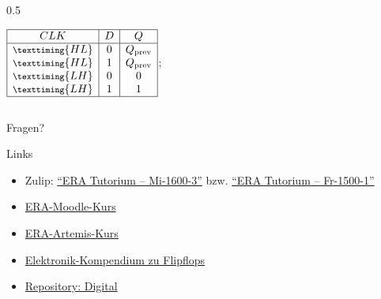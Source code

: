\begin{frame}[c]
\begin{columns}[c]
\begin{column}{0.5\textwidth}
\begin{center}
\begin{circuitikz}
{						$\displaystyle
							\begin{array}{|c|c|c|}
								\hline
								CLK                            & D & Q                 \\
								\hline
								\footnotesize{\texttiming{HL}} & 0 & Q_{\textrm{prev}} \\
								\footnotesize{\texttiming{HL}} & 1 & Q_{\textrm{prev}} \\
								\footnotesize{\texttiming{LH}} & 0 & 0                 \\
								\footnotesize{\texttiming{LH}} & 1 & 1                 \\
								\hline
							\end{array}
						$};
				\end{circuitikz}
			\end{center}
		\end{column}
	\end{columns}
\end{frame}


\begin{frame}[c, fragile]{}{}
	\begin{center}
		\LARGE Fragen?
	\end{center}
\end{frame}


\begin{frame}[c, fragile]{Links}{}
	\begin{itemize}
		\item Zulip: \href{https://zulip.in.tum.de/#narrow/channel/3255-ERA-Tutorium-.E2.80.93-Mi-1600-3}{\enquote{ERA Tutorium -- Mi-1600-3}}
		      bzw. \href{https://zulip.in.tum.de/#narrow/channel/3264-ERA-Tutorium-.E2.80.93-Fr-1500-1}{\enquote{ERA Tutorium -- Fr-1500-1}}
		\item \href{https://www.moodle.tum.de/course/view.php?id=111440}{ERA-Moodle-Kurs}
		\item \href{https://artemis.tum.de/courses/516}{ERA-Artemis-Kurs}
		\item \href{https://www.elektronik-kompendium.de/sites/dig/0209301.htm}{Elektronik-Kompendium zu Flipflops}
		\item \href{https://github.com/hneemann/Digital}{Repository: Digital}
	\end{itemize}
\end{frame}

\maketitle


